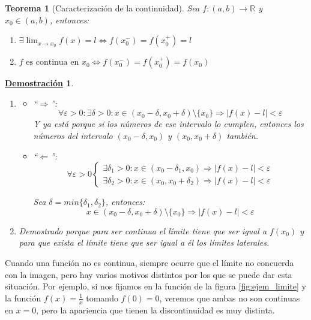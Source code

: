 \documentclass[10pt,a4paper,openright]{book}
\theoremstyle{break}
\newtheorem{theo}{Teorema}[chapter]
\newtheorem*{demo}{\underline{Demostración}}
\begin{document}
\begin{theo}[Caracterización de la continuidad]
Sea $f: (a,b)\longrightarrow \mathbb R$ y $x_0\in (a,b)$, entonces:
\begin{enumerate}
\item $\exists \lim_{x\rightarrow x_0} f(x)=l\Leftrightarrow f(x_0^-)=f(x_0^+)=l$

\item $f \mbox{ es continua en }x_0 \Leftrightarrow f(x_0^-)=f(x_0^+)=f(x_0)$
\end{enumerate}
\end{theo}
\begin{demo}
\begin{enumerate}
\item 
	\begin{itemize}
	\item ``$\Rightarrow $'':
	$$\forall\varepsilon>0: \exists \delta>0: x\in (x_0-\delta, x_0+\delta)\mbox{\textbackslash}\{x_0\}\Rightarrow |f(x)-l|<\varepsilon$$
	Y ya está porque si los números de ese intervalo lo cumplen, entonces los números del intervalo $(x_0-\delta, x_0)$ y $(x_0, x_0+\delta)$ también.
	
	\item ``$\Leftarrow$'':
	$$\forall \varepsilon>0\begin{cases}\exists \delta_1>0: x\in (x_0-\delta_1, x_0)\Rightarrow |f(x)-l|<\varepsilon \\
	\exists \delta_2>0: x\in (x_0,x_0+\delta_2)\Rightarrow |f(x)-l|<\varepsilon\end{cases}$$
	
 	Sea $\delta =min\{ \delta_1, \delta_2\}$, entonces:
	$$x\in (x_0-\delta, x_0+\delta)\mbox{\textbackslash}\{x_0\}\Rightarrow |f(x)-l|<\varepsilon$$
	\end{itemize}
	
\item Demostrado porque para ser continua el límite tiene que ser igual a $f(x_0)$ y para que exista el límite tiene que ser igual a él los límites laterales.
\end{enumerate}
\end{demo}

Cuando una función no es continua, siempre ocurre que el límite no concuerda con la imagen, pero hay varios motivos distintos por los que se puede dar esta situación. Por ejemplo, si nos fijamos en la función de la figura \ref{fig:ejem_limite} y la función $f(x) = \frac{1}{x}$ tomando $f(0) = 0$, veremos que ambas no son continuas en $x=0$, pero la apariencia que tienen la discontinuidad es muy distinta.
\end{document}

